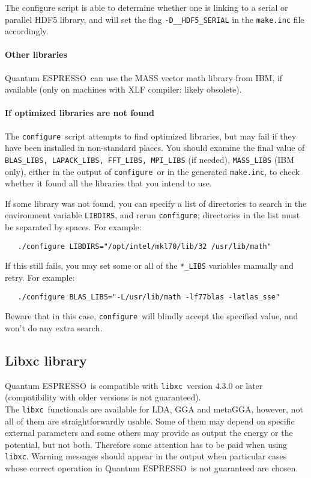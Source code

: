 \documentclass[12pt,a4paper]{article}
\def\qe{{\sc Quantum ESPRESSO}}
\def\configure{\texttt{configure}}
\def\libxc{\texttt{libxc}}
\begin{document}
The configure script is able to determine whether one is linking to a
serial or parallel HDF5 library, and will  set the flag
\texttt{-D\_\_HDF5\_SERIAL} in the \texttt{make.inc} file accordingly.


\paragraph{Other libraries}
\qe\ can use the MASS vector math
library from IBM, if available (only on machines with XLF compiler:
likely obsolete).

\paragraph{If optimized libraries are not found}
The \configure\ script attempts to find optimized libraries, but may fail
if they have been installed in non-standard places. You should examine
the final value of \texttt{BLAS\_LIBS, LAPACK\_LIBS, FFT\_LIBS, MPI\_LIBS} (if needed),
\texttt{MASS\_LIBS} (IBM only), either in the output of \configure\ or in the generated
\texttt{make.inc}, to check whether it found all the libraries that you intend to use.

If some library was not found, you can specify a list of directories to search
in the environment variable \texttt{LIBDIRS},
and rerun \configure; directories in the
list must be separated by spaces. For example:
\begin{verbatim}
   ./configure LIBDIRS="/opt/intel/mkl70/lib/32 /usr/lib/math"
\end{verbatim}
If this still fails, you may set some or all of the \texttt{*\_LIBS} variables manually
and retry. For example:
\begin{verbatim}
   ./configure BLAS_LIBS="-L/usr/lib/math -lf77blas -latlas_sse"
\end{verbatim}
Beware that in this case, \configure\ will blindly accept the specified value,
and won't do any extra search.

\subsection{Libxc library}

\qe\ is compatible with \libxc\ version 4.3.0 or later (compatibility with older versions is not guaranteed).\\
The \libxc\ functionals are available for LDA, GGA and metaGGA, however, not all of them are straightforwardly usable. Some of them may depend on specific external parameters and some others may provide as output the energy or the potential, but not both. Therefore some attention has to be paid when using \libxc. Warning messages should appear in the output when particular cases whose correct operation in \qe\ is not guaranteed are chosen.
\end{document}

